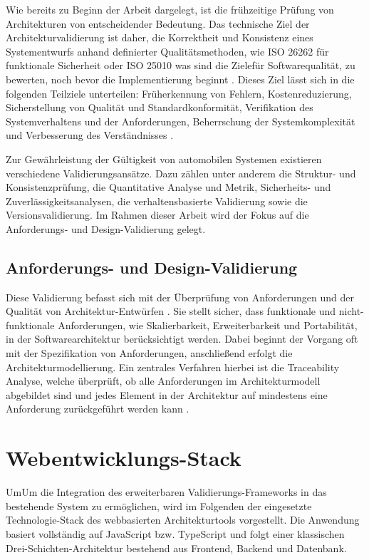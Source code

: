 Wie bereits zu Beginn der Arbeit dargelegt, ist die frühzeitige Prüfung von Architekturen von entscheidender Bedeutung. Das technische Ziel der Architekturvalidierung ist daher, die Korrektheit und Konsistenz eines Systementwurfs anhand definierter Qualitätsmethoden, wie  ISO 26262 für funktionale Sicherheit oder ISO 25010 was sind die Zielefür Softwarequalität, zu bewerten, noch bevor die Implementierung beginnt \cite{venkitachalam2015}. Dieses Ziel lässt sich in die folgenden Teilziele unterteilen: Früherkennung von Fehlern, Kostenreduzierung, Sicherstellung von Qualität und Standardkonformität, Verifikation des Systemverhaltens und der Anforderungen, Beherrschung der Systemkomplexität und Verbesserung des Verständnisses\cite{venkitachalam2015} \cite{Kan19} \cite{bucher2019crosslayera}.

Zur Gewährleistung der Gültigkeit von automobilen Systemen existieren verschiedene Validierungsansätze. Dazu zählen unter anderem die Struktur- und Konsistenzprüfung,  die Quantitative Analyse und Metrik, Sicherheits- und Zuverlässigkeitsanalysen, die verhaltensbasierte Validierung sowie die Versionsvalidierung. Im Rahmen dieser Arbeit wird der Fokus auf die Anforderungs- und Design-Validierung gelegt.

\subsection*{Anforderungs- und Design-Validierung}

Diese Validierung befasst sich mit der Überprüfung von Anforderungen und der Qualität von Architektur-Entwürfen \cite{ahrens2013objective}\cite{knieke2022managed}. Sie stellt sicher, dass funktionale und nicht-funktionale Anforderungen, wie Skalierbarkeit, Erweiterbarkeit und Portabilität, in der Softwarearchitektur berücksichtigt werden. Dabei beginnt der Vorgang oft mit der Spezifikation von Anforderungen, anschließend erfolgt die Architekturmodellierung. Ein zentrales Verfahren hierbei ist die Traceability Analyse, welche überprüft, ob alle Anforderungen im Architekturmodell abgebildet sind und jedes Element in der Architektur auf mindestens eine Anforderung zurückgeführt werden kann \cite{vogel2021metrics}.

\section{Webentwicklungs-Stack}

UmUm die Integration des erweiterbaren Validierungs-Frameworks in das bestehende System zu ermöglichen, wird im Folgenden der eingesetzte Technologie-Stack des webbasierten Architekturtools vorgestellt. Die Anwendung basiert vollständig auf JavaScript bzw. TypeScript und folgt einer klassischen Drei-Schichten-Architektur bestehend aus Frontend, Backend und Datenbank.

